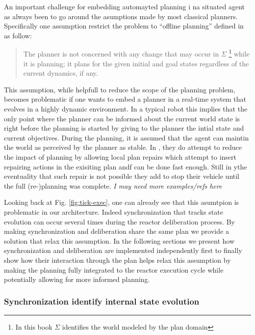 An important challenge for embedding automayted planning i na situated
agent as always been to go around the asumptions made by most classical
planners. Specifically one assumption restrict the problem to ``offline
planning''  defined in \cite{ghallab04} as follow:

\begin{quotation}
  The planner is not concerned with any change that may occur in
  $\Sigma$ \footnote{In this book $\Sigma$ identifies the world modeled
    by the plan domain} while it is planning; it plans for the given
  initial and goal states regardless of the current dynamics, if any.
\end{quotation}

This assumption, while helpfull to reduce the scope of the planning
problem, becomes problematic if one wants to embed a planner in a
real-time system that evolves in a highly dynamic environment. In a
typical robot this implies that the only point where the planner can
be informed about the current world state is right before the planning
is started by giving to the planner the intial state and current
objectives. During the planning, it is assumed that the agent can
maintin the world as perceived by the planner as stable. In
\cite{lemai04, lemai-chenevier2004}, they do attempt to reduce the
impact of planning by allowing local plan repairs which attempt to
insert repairing actions in the exisiting plan andf can be done fast
enough. Still in ythe eventuality that such repair is not possible
they add to stop their vehicle until the full (re-)planning was
complete. {\em I may need more examples/refs here}

Looking back at Fig. \ref{fig:tick-exec}, one can already see that
this asumtpion is problematic in our architecture. Indeed
synchronization that tracks state evolution can occur several times
during the reactor deliberation process. By making synchronization and
deliberation share the same plan we provide a solution that relax this
assumption. In the following sections we present how synchronization
and deliberation are implemented independently first to finally show
how their interaction through the plan helps relax this assumption by
making the planning fully integrated to the reactor execution cycle
while potentially allowing for more informed planning.

\subsubsection{Synchronization identify internal state evolution}
\label{sec:arch:synch}

